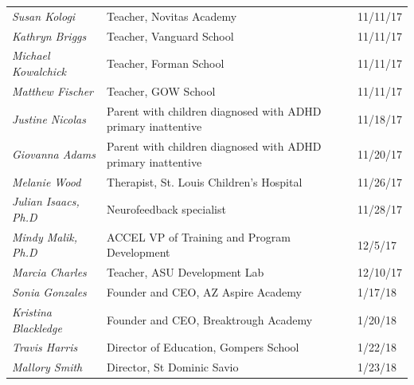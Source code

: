 \documentclass[letterpaper,10pt]{article}
\begin{document}
\begin{appendices}
\begin{table}[]
\begin{tabular}{lll}
\textit{Susan Kologi}                    & Teacher, Novitas Academy                                               & 11/11/17                          \\
\textit{Kathryn Briggs}                  & Teacher, Vanguard School                                               & 11/11/17                          \\
\textit{Michael Kowalchick}              & Teacher, Forman School                                                 & 11/11/17                          \\
\textit{Matthew Fischer}                 & Teacher, GOW School                                                    & 11/11/17                          \\
\textit{Justine Nicolas}                 & Parent with children diagnosed with ADHD primary inattentive           & 11/18/17                          \\
\textit{Giovanna Adams}                  & Parent with children diagnosed with ADHD primary inattentive           & 11/20/17                          \\
\textit{Melanie Wood}                    & Therapist, St. Louis Children’s Hospital                               & 11/26/17                          \\
\textit{Julian Isaacs, Ph.D}             & Neurofeedback specialist                                              & 11/28/17                          \\
\textit{Mindy Malik, Ph.D}               & ACCEL VP of Training and Program Development                           & 12/5/17                           \\
\textit{Marcia Charles}                  & Teacher, ASU Development Lab                                           & 12/10/17                          \\
\textit{Sonia Gonzales}                  & Founder and CEO, AZ Aspire Academy                                     & 1/17/18                           \\
\textit{Kristina Blackledge}             & Founder and CEO, Breaktrough Academy                                   & 1/20/18                           \\
\textit{Travis Harris}                   & Director of Education, Gompers School                                  & 1/22/18                           \\
\textit{Mallory Smith}                   & Director, St Dominic Savio                                             & 1/23/18                           \\

\end{tabular}
\end{table}
\end{appendices}
\end{document}
